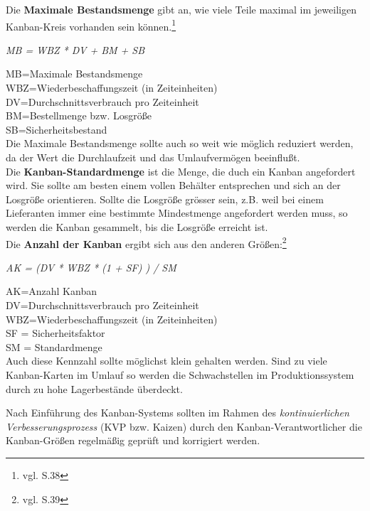 Die \textbf{Maximale Bestandsmenge} gibt an, wie viele Teile maximal im jeweiligen Kanban-Kreis vorhanden sein können.\footnote{vgl. \cite{Geiger2011Kanban} S.38}

\centerline{\textit{MB = WBZ * DV + BM + SB}}
 MB=Maximale Bestandsmenge\\
 WBZ=Wiederbeschaffungszeit (in Zeiteinheiten)\\
 DV=Durchschnittsverbrauch pro Zeiteinheit\\
 BM=Bestellmenge bzw. Losgröße\\
 SB=Sicherheitsbestand\\
Die Maximale Bestandsmenge sollte auch so weit wie möglich reduziert werden, da der Wert die Durchlaufzeit und das Umlaufvermögen beeinflußt.\\

Die \textbf{Kanban-Standardmenge} ist die Menge, die duch ein Kanban angefordert wird.
Sie sollte am besten einem vollen Behälter entsprechen und sich an der Losgröße orientieren.
Sollte die Losgröße grösser sein, z.B. weil bei einem Lieferanten immer eine bestimmte Mindestmenge angefordert werden muss, 
so werden die Kanban gesammelt, bis die Losgröße erreicht ist.\\

Die \textbf{Anzahl der Kanban} ergibt sich aus den anderen Größen:\footnote{vgl. \cite{Geiger2011Kanban} S.39}

\centerline{\textit{AK = (DV * WBZ * (1 + SF) ) / SM}}

 AK=Anzahl Kanban\\
 DV=Durchschnittsverbrauch pro Zeiteinheit\\
 WBZ=Wiederbeschaffungszeit (in Zeiteinheiten)\\
 SF = Sicherheitsfaktor\\
 SM = Standardmenge\\
Auch diese Kennzahl sollte möglichst klein gehalten werden. Sind zu viele Kanban-Karten im Umlauf so 
werden die Schwachstellen im Produktionssystem durch zu hohe Lagerbestände überdeckt.

Nach Einführung des Kanban-Systems sollten im Rahmen des \textit{kontinuierlichen Verbesserungsprozess} (KVP bzw. Kaizen) 
durch den Kanban-Verantwortlicher die Kanban-Größen regelmäßig geprüft und korrigiert werden. 

